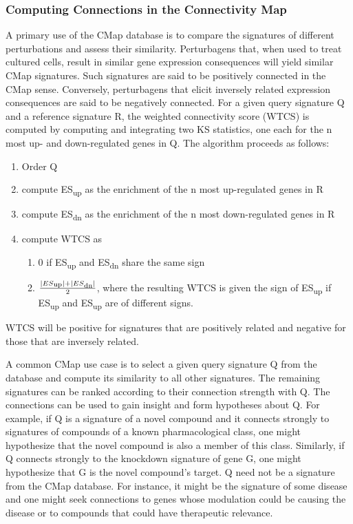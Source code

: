 \documentclass[12pt]{article}
\begin{document}
\subsubsection{Computing Connections in the Connectivity Map}

A primary use of the CMap database is to compare the signatures of different perturbations and assess their similarity. Perturbagens that, when used to treat cultured cells, result in similar gene expression consequences will yield similar CMap signatures. Such signatures are said to be positively connected in the CMap sense. Conversely, perturbagens that elicit inversely related expression consequences are said to be negatively connected. For a given query signature Q and a reference signature R, the weighted connectivity score (WTCS) is computed by computing and integrating two KS statistics, one each for the n most up- and down-regulated genes in Q. The algorithm proceeds as follows:
\begin{enumerate}
\item Order Q
\item compute ES\textsubscript{up} as the enrichment of the n most up-regulated genes in R
\item compute ES\textsubscript{dn} as the enrichment of the n most down-regulated genes in R
\item compute WTCS as 
\begin{enumerate}
	\item 0 if ES\textsubscript{up} and ES\textsubscript{dn} share the same sign
	\item $ \frac{|ES\textsubscript{up}| + |ES\textsubscript{dn}|}{2} $, where the resulting WTCS is given the sign of ES\textsubscript{up} if ES\textsubscript{up} and ES\textsubscript{up} are of different signs.
\end{enumerate}
\end{enumerate}

WTCS will be positive for signatures that are positively related and negative for those that are inversely related.

A common CMap use case is to select a given query signature Q from the database and compute its similarity to all other signatures. The remaining signatures can be ranked according to their connection strength with Q. The connections can be used to gain insight and form hypotheses about Q. For example, if Q is a signature of a novel compound and it connects strongly to signatures of compounds of a known pharmacological class, one might hypothesize that the novel compound is also a member of this class. Similarly, if Q connects strongly to the knockdown signature of gene G, one might hypothesize that G is the novel compound's target. Q need not be a signature from the CMap database. For instance, it might be the signature of some disease and one might seek connections to genes whose modulation could be causing the disease or to compounds that could have therapeutic relevance. 
\end{document}
